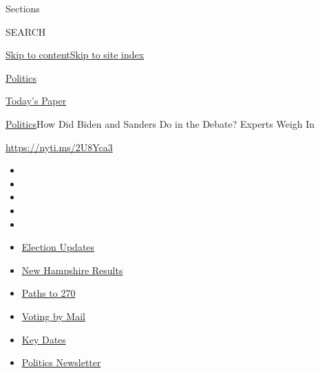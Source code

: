 Sections

SEARCH

\protect\hyperlink{site-content}{Skip to
content}\protect\hyperlink{site-index}{Skip to site index}

\href{https://www.nytimes3xbfgragh.onion/section/politics}{Politics}

\href{https://myaccount.nytimes3xbfgragh.onion/auth/login?response_type=cookie\&client_id=vi}{}

\href{https://www.nytimes3xbfgragh.onion/section/todayspaper}{Today's
Paper}

\href{/section/politics}{Politics}\textbar{}How Did Biden and Sanders Do
in the Debate? Experts Weigh In

\url{https://nyti.ms/2U8Yca3}

\begin{itemize}
\item
\item
\item
\item
\item
\end{itemize}

\begin{itemize}
\item
  \href{https://www.nytimes3xbfgragh.onion/live/2020/09/09/us/trump-vs-biden?action=click\&pgtype=Article\&state=default\&region=TOP_BANNER\&context=storylines_menu}{Election
  Updates}
\item
  \href{https://www.nytimes3xbfgragh.onion/interactive/2020/09/08/us/elections/results-new-hampshire-primary-elections.html?action=click\&pgtype=Article\&state=default\&region=TOP_BANNER\&context=storylines_menu}{New
  Hampshire Results}
\item
  \href{https://www.nytimes3xbfgragh.onion/interactive/2020/us/elections/election-states-biden-trump.html?action=click\&pgtype=Article\&state=default\&region=TOP_BANNER\&context=storylines_menu}{Paths
  to 270}
\item
  \href{https://www.nytimes3xbfgragh.onion/interactive/2020/08/31/us/politics/vote-by-mail-deadlines.html?action=click\&pgtype=Article\&state=default\&region=TOP_BANNER\&context=storylines_menu}{Voting
  by Mail}
\item
  \href{https://www.nytimes3xbfgragh.onion/interactive/2019/us/elections/2020-presidential-election-calendar.html?action=click\&pgtype=Article\&state=default\&region=TOP_BANNER\&context=storylines_menu}{Key
  Dates}
\item
  \href{https://www.nytimes3xbfgragh.onion/newsletters/politics?action=click\&pgtype=Article\&state=default\&region=TOP_BANNER\&context=storylines_menu}{Politics
  Newsletter}
\end{itemize}

